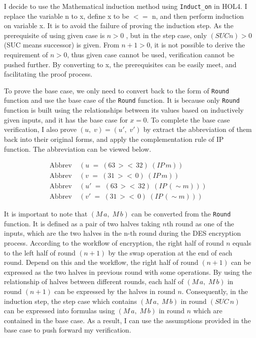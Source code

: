 \documentclass{article}
\begin{document}
I decide to use the Mathematical induction method using \verb|Induct_on| in HOL4. I replace the variable n to x, define x to be $<=$ n, and then
perform induction on variable x. It is to avoid the failure of proving the induction step. As the prerequisite of using
given case is $n>0$ , but in the step case, only $(SUC n) > 0$ (SUC means successor) is given. From $n+1 > 0$, it is not possible to
derive the requirement of $n > 0$, thus given case cannot be used, verification cannot be pushed further. By converting to x,
the prerequisites can be easily meet, and facilitating the proof process.

To prove the base case, we only need to convert back to the form of \verb|Round| function and use the base case of the \verb|Round| function.
It is because only \verb|Round| function is built using the relationships between its values based on inductively given inputs, and
it has the base case for $x=0$. To complete the
base case verification, I also prove $(u,\;v)= (u',\;v')$ by extract the abbreviation of them back into their original forms, and apply the complementation rule of
IP function. The abbreviation can be viewed below.

\begin{align*}
\text{Abbrev} \; & (u \;=\; (63 \,><\, 32) \; (IP \,m)) \\
\text{Abbrev} \; & (v \;=\; (31 \,><\, 0) \; (IP \,m)) \\
\text{Abbrev} \; & (u' \;=\; (63 \,><\, 32) \; (IP \,(\sim m))) \\
\text{Abbrev} \; & (v' \;=\; (31 \,><\, 0) \; (IP \,(\sim m)))
\end{align*}


It is important to note that $(M \,a,\;M \,b)$ can be converted from the \verb|Round| function. It is defined as a pair of two
halves taking $n$th round as one of the inputs,
which are the two halves in the n-th round during the DES encryption process. According to the workflow of encryption, the right
half of round $n$ equals to the left half of round $(n+1)$ by the swap operation at the end of each round. Depend on this and the workflow,
the right half of round $(n+1)$ can be expressed as the two halves in previous round with some operations.
By using the relationship of halves between different rounds,
each half of $(M \,a,\;M \,b)$ in round $(n+1)$ can be expressed by the halves in round $n$. Consequently, in the induction step,
the step case which contains $(M \,a,\;M \,b)$ in round $(SUC \,n)$ can be expressed into formulas using $(M \,a,\;M \,b)$ in round
$n$ which are contained in the base case. As a result, I can use the assumptions provided in the base case to push forward my
verification.
\end{document}
